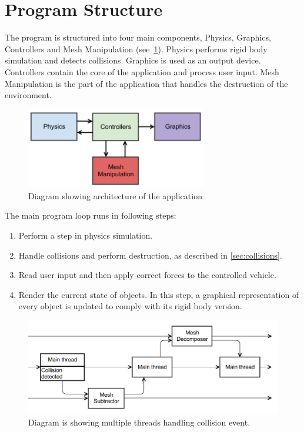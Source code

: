 \section{Program Structure}
The program is structured into four main components, Physics, Graphics, Controllers and Mesh Manipulation (see~\cref{fig:architecture}). Physics performs rigid body simulation and detects collisions. Graphics is used as an output device. Controllers contain the core of the application and process user input. Mesh Manipulation is the part of the application that handles the destruction of the environment.
\begin{figure}
        \centering
        \includegraphics[width=0.7\textwidth]{img/architecture}
        \caption{Diagram showing architecture of the application}
        \label{fig:architecture}
\end{figure}

\label{sec:structure}
The main program loop runs in following steps:
\begin{enumerate}
\item Perform a step in physics simulation.
\item Handle collisions and perform destruction, as described in  \cref{sec:collisions}.
\item Read user input and then apply correct forces to the controlled vehicle.
\item Render the current state of objects. In this step, a graphical representation of every object is updated to comply with its rigid body version.
\end{enumerate}

\begin{figure}
        \centering
        \includegraphics[width=\textwidth]{img/decompositionFlow}
        \caption{Diagram is showing multiple threads handling collision event. }
        \label{fig:threads}
\end{figure}


